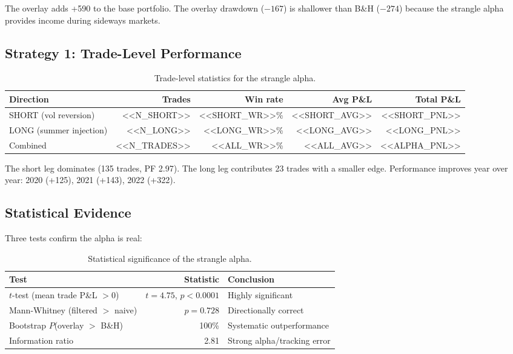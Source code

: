 \documentclass[11pt,a4paper]{article}
\begin{document}
The overlay adds +590 to the base portfolio. The overlay drawdown ($-167$) is shallower than B\&H ($-274$) because the strangle alpha provides income during sideways markets.

\subsection{Strategy 1: Trade-Level Performance}

\begin{table}[H]
\centering
\caption{Trade-level statistics for the strangle alpha.}
\begin{tabular}{lrrrr}
\toprule
Direction & Trades & Win rate & Avg P\&L & Total P\&L \\
\midrule
SHORT (vol reversion) & <<N_SHORT>> & <<SHORT_WR>>\% & <<SHORT_AVG>> & <<SHORT_PNL>> \\
LONG (summer injection) & <<N_LONG>> & <<LONG_WR>>\% & <<LONG_AVG>> & <<LONG_PNL>> \\
\midrule
Combined & <<N_TRADES>> & <<ALL_WR>>\% & <<ALL_AVG>> & <<ALPHA_PNL>> \\
\bottomrule
\end{tabular}
\end{table}

The short leg dominates (135 trades, PF 2.97). The long leg contributes 23 trades with a smaller edge. Performance improves year over year: 2020 (+125), 2021 (+143), 2022 (+322).

\subsection{Statistical Evidence}

Three tests confirm the alpha is real:

\begin{table}[H]
\centering
\caption{Statistical significance of the strangle alpha.}
\begin{tabular}{lrl}
\toprule
Test & Statistic & Conclusion \\
\midrule
$t$-test (mean trade P\&L $> 0$) & $t = 4.75$, $p < 0.0001$ & Highly significant \\
Mann-Whitney (filtered $>$ naive) & $p = 0.728$ & Directionally correct \\
Bootstrap $P$(overlay $>$ B\&H) & 100\% & Systematic outperformance \\
Information ratio & 2.81 & Strong alpha/tracking error \\
\bottomrule
\end{tabular}
\end{table}
\end{document}
